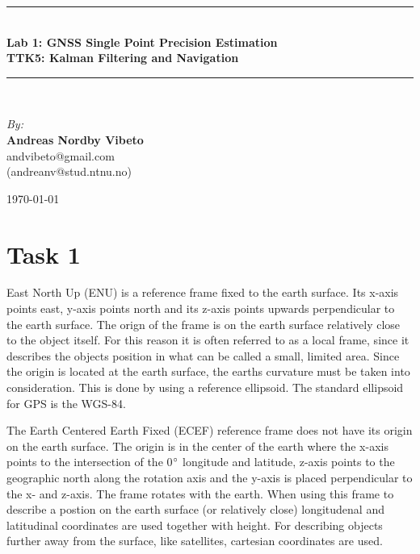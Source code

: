 \documentclass{article}
\newcommand{\HRule}{\rule{\linewidth}{0.5mm}}
\begin{document}

\begin{center}

\HRule \\[0.4cm]
{ \huge \bfseries Lab 1: GNSS Single Point Precision Estimation \\[0.4cm] 
\Large \bfseries TTK5: Kalman Filtering and Navigation \\[0.4cm] } 

\HRule \\[1.5cm]

\begin{center} \large
\emph{By:}\\
\textbf{Andreas Nordby Vibeto}\\
andvibeto@gmail.com \\
(andreanv@stud.ntnu.no)
\end{center}

\vfill

{\large \today}

\end{center}
\newpage
{}

\section*{Task 1}

East North Up (ENU) is a reference frame fixed to the earth surface. Its x-axis points east, y-axis points north and its z-axis points upwards perpendicular to the earth surface. The orign of the frame is on the earth surface relatively close to the object itself. For this reason it is often referred to as a local frame, since it describes the objects position in what can be called a small, limited area. Since the origin is located at the earth surface, the earths curvature must be taken into consideration. This is done by using a reference ellipsoid. The standard ellipsoid for GPS is the WGS-84.

The Earth Centered Earth Fixed (ECEF) reference frame does not have its origin on the earth surface. The origin is in the center of the earth where the x-axis points to the intersection of the 0$\degree$ longitude and latitude, z-axis points to the geographic north along the rotation axis and the y-axis is placed perpendicular to the x- and z-axis. The frame rotates with the earth. When using this frame to describe a postion on the earth surface (or relatively close) longitudenal and latitudinal coordinates are used together with height. For describing objects further away from the surface, like satellites, cartesian coordinates are used.
\end{document}
